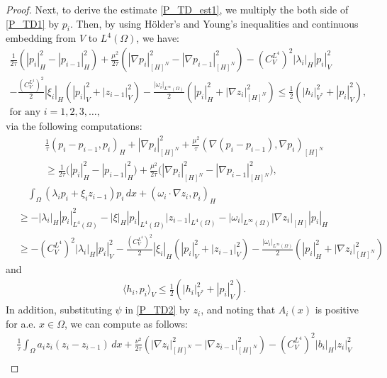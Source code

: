 \documentclass{sinst}
\numberwithin{equation}{section}
\theoremstyle{plain}
\theoremstyle{definition}
\def\dual#1{\langle #1 \rangle}
\begin{document}
\begin{proof}
  Next, to derive the estimate \eqref{P_TD_est1}, we multiply the both side of \eqref{P_TD1} by $p_i$. Then, by using H\"older's and Young's inequalities and continuous embedding from $V$ to $L^4(\Omega)$, we have:
  \begin{gather}
    \frac{1}{2\tau}(|p_i|_H^2 - |p_{i-1}|_H^2) + \frac{\mu^2}{2\tau} (|\nabla p_i|_{[H]^N}^2 - |\nabla p_{i-1}|_{[H]^N}^2) - (C_V^{L^4})^2 |\lambda_i|_H |p_i|_V^2 \label{P_TD_est4}
    \\
    - \frac{(C_V^{L^4})^2}{2}|\xi_i|_H (|p_i|_V^2 + |z_{i-1}|_V^2) - \frac{|\omega_i|_{L^\infty(\Omega)}}{2}(|p_i|_H^2 + |\nabla z_i|_{[H]^N}^2) \leq \frac{1}{2}(|h_i|_{V^*}^2 + |p_i|_V^2),
    \\
    \mbox{for any } i = 1,2,3,\dots, 
  \end{gather}
  via the following computations:
  \begin{gather}
    \frac{1}{\tau}(p_i - p_{i-1}, p_i)_H + |\nabla p_i|_{[H]^N}^2 + \frac{\mu^2}{\tau}(\nabla (p_i - p_{i-1}), \nabla p_i)_{[H]^N}
    \\
    \geq \frac{1}{2\tau}\bigl( |p_i|_H^2 - |p_{i-1}|_H^2 \bigr) + \frac{\mu^2}{2\tau} \bigl( |\nabla p_i|_{[H]^N}^2 - |\nabla p_{i-1}|_{[H]^N}^2 \bigr),
  \end{gather}
  \begin{align}
      &\quad \int_\Omega (\lambda_i p_i + \xi_i z_{i-1}) p_i \,dx + (\omega_i \cdot \nabla z_i, p_i)_H
      \\
      &\geq - |\lambda_i|_H |p_i|_{L^4(\Omega)}^2 - |\xi|_H |p_i|_{L^4(\Omega)} |z_{i-1}|_{L^4(\Omega)} - |\omega_i|_{L^\infty(\Omega)}|\nabla z_i|_{[H]}|p_i|_H
      \\
      &\geq - (C_V^{L^4})^2 |\lambda_i|_H |p_i|_V^2 - \frac{(C_V^{L^4})^2}{2}|\xi_i|_H (|p_i|_V^2 + |z_{i-1}|_V^2) - \frac{|\omega_i|_{L^\infty(\Omega)}}{2}(|p_i|_H^2 + |\nabla z_i|_{[H]^N}^2)
  \end{align}
  and
  \begin{gather}
    \dual{h_i, p_i}_V \leq \frac{1}{2}(|h_i|_{V^*}^2 + |p_i|_V^2).
  \end{gather}
  In addition, substituting $\psi$ in \eqref{P_TD2} by $z_i$, and noting that $A_i(x)$ is positive for a.e.  $x \in \Omega$, we can compute as follows:
  \begin{gather}
    \frac{1}{\tau}\int_\Omega a_i z_i (z_i - z_{i-1}) \,dx + \frac{\nu^2}{2\tau} (|\nabla z_i|_{[H]^N}^2 - |\nabla z_{i-1}|_{[H]^N}^2) - (C_V^{L^4})^2 |b_i|_H |z_i|_V^2 \label{P_TD_est5}
    \\

\end{gather}
\end{proof}
\end{document}
